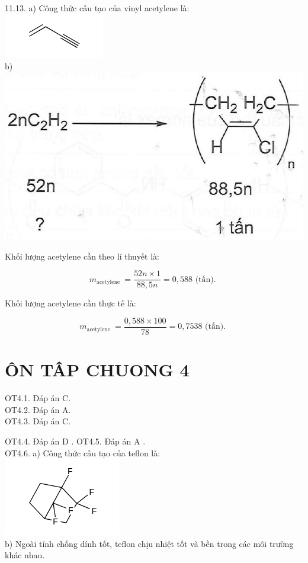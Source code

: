 \documentclass[10pt]{article}
\begin{document}
\begin{itemize}
11.13. a) Công thức cấu tạo của vinyl acetylene là:\\
\includegraphics{smile-a15bf9a63674fc92613b3d6aad9d90e062e347e3}\\
b)\\
\includegraphics[max width=\textwidth, center]{2025_10_23_b4e16b74380d0f7e7700g-070}
\end{itemize}

Khối lượng acetylene cần theo lí thuyết là:

$$
m_{\text {acetylene }}=\frac{52 n \times 1}{88,5 n}=0,588 \text { (tấn). }
$$

Khối lượng acetylene cần thực tế là:

$$
m_{\text {acetylene }}=\frac{0,588 \times 100}{78}=0,7538 \text { (tấn). }
$$

\section*{ÔN TÂP CHUONG 4}
OT4.1. Đáp án C.\\
OT4.2. Đáp án A.\\
OT4.3. Đáp án C.

OT4.4. Đáp án D . OT4.5. Đáp án A .\\
OT4.6. a) Công thức cấu tạo của teflon là:\\
\includegraphics{smile-bb950c4f873a2dddbff8f4b9505fbdbc7314c66b}\\
b) Ngoài tính chống dính tốt, teflon chịu nhiệt tốt và bền trong các môi trường khác nhau.
\end{document}
